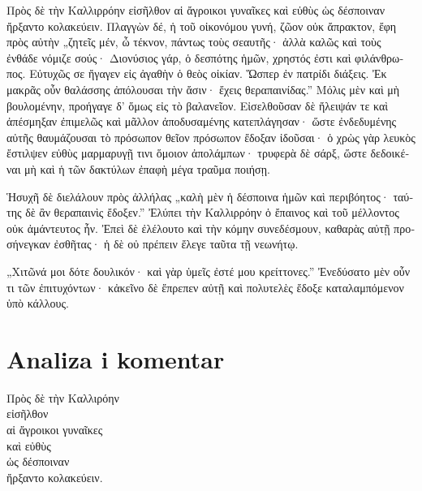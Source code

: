 {\large

\begin{greek}

\noindent Πρὸς δὲ τὴν Καλλιρρόην εἰσῆλθον αἱ ἄγροικοι γυναῖκες καὶ εὐθὺς ὡς δέσποιναν ἤρξαντο κολακεύειν. Πλαγγὼν δέ, ἡ τοῦ οἰκονόμου γυνή, ζῶον οὐκ ἄπρακτον, ἔφη πρὸς αὐτὴν „ζητεῖς μέν, ὦ τέκνον, πάντως τοὺς σεαυτῆς· ἀλλὰ καλῶς καὶ τοὺς ἐνθάδε νόμιζε σούς· Διονύσιος γάρ, ὁ δεσπότης ἡμῶν, χρηστός ἐστι καὶ φιλάνθρωπος. Εὐτυχῶς σε ἤγαγεν εἰς ἀγαθὴν ὁ θεὸς οἰκίαν. Ὥσπερ ἐν πατρίδι διάξεις. Ἐκ μακρᾶς οὖν θαλάσσης ἀπόλουσαι τὴν ἄσιν· ἔχεις θεραπαινίδας.” Μόλις μὲν καὶ μὴ βουλομένην, προήγαγε δ' ὅμως εἰς τὸ βαλανεῖον. Εἰσελθοῦσαν δὲ ἤλειψάν τε καὶ ἀπέσμηξαν ἐπιμελῶς καὶ μᾶλλον ἀποδυσαμένης κατεπλάγησαν· ὥστε ἐνδεδυμένης αὐτῆς θαυμάζουσαι τὸ πρόσωπον θεῖον πρόσωπον ἔδοξαν ἰδοῦσαι· ὁ χρὼς γὰρ λευκὸς ἔστιλψεν εὐθὺς μαρμαρυγῇ τινι ὅμοιον ἀπολάμπων· τρυφερὰ δὲ σάρξ, ὥστε δεδοικέναι μὴ καὶ ἡ τῶν δακτύλων ἐπαφὴ μέγα τραῦμα ποιήσῃ.

\noindent Ἡσυχῆ δὲ διελάλουν πρὸς ἀλλήλας „καλὴ μὲν ἡ δέσποινα ἡμῶν καὶ περιβόητος· ταύτης δὲ ἂν θεραπαινὶς ἔδοξεν.” Ἐλύπει τὴν Καλλιρρόην ὁ ἔπαινος καὶ τοῦ μέλλοντος οὐκ ἀμάντευτος ἦν. Ἐπεὶ δὲ ἐλέλουτο καὶ τὴν κόμην συνεδέσμουν, καθαρὰς αὐτῇ προσήνεγκαν ἐσθῆτας· ἡ δὲ οὐ πρέπειν ἔλεγε ταῦτα τῇ νεωνήτῳ.

\noindent „Χιτῶνά μοι δότε δουλικόν· καὶ γὰρ ὑμεῖς ἐστέ μου κρείττονες.” Ἐνεδύσατο μὲν οὖν τι τῶν ἐπιτυχόντων· κἀκεῖνο δὲ ἔπρεπεν αὐτῇ καὶ πολυτελὲς ἔδοξε καταλαμπόμενον ὑπὸ κάλλους.


\end{greek}

}


\section*{Analiza i komentar}


{\large
\begin{greek}
\noindent Πρὸς δὲ τὴν Καλλιρόην \\
εἰσῆλθον \\
αἱ ἄγροικοι γυναῖκες \\
καὶ εὐθὺς \\
\tabto{2em} ὡς δέσποιναν \\
ἤρξαντο κολακεύειν.\\

\end{greek}
}

